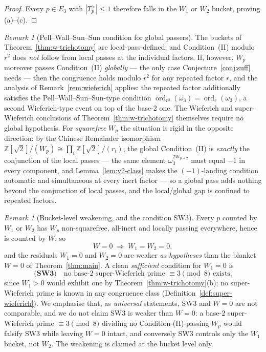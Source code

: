 \documentclass[11pt]{amsart}
\theoremstyle{plain}
\theoremstyle{definition}
\theoremstyle{remark}
\newtheorem{remark}[theorem]{Remark}
\numberwithin{equation}{section}
\newcommand{\ord}{\operatorname{ord}}
\newcommand{\Z}{\mathbb{Z}}
\begin{document}
\begin{proof}
Every $p \in E_3$ with $|T_p^{>}| \leq 1$ therefore falls in the $W_1$ or $W_2$ bucket, proving (a)--(c).
\end{proof}

\begin{remark}[Pell--Wall--Sun--Sun condition for global passers]\label{rem:pell-wss-global}
The buckets of Theorem~\ref{thm:w-trichotomy} are local-pass-defined, and Condition~(II) modulo $r^2$ does \emph{not} follow from local passes at the individual factors. If, however, $W_p$ moreover passes Condition~(II) \emph{globally} --- the only case Conjecture~\ref{conj:suff} needs --- then the congruence holds modulo $r^2$ for any repeated factor $r$, and the analysis of Remark~\ref{rem:wieferich} applies: the repeated factor additionally satisfies the Pell--Wall--Sun--Sun-type condition $\ord_{r^2}(\omega_3) = \ord_r(\omega_3)$, a second Wieferich-type event on top of the base-$2$ one. The Wieferich and super-Wieferich conclusions of Theorem~\ref{thm:w-trichotomy} themselves require no global hypothesis. For \emph{squarefree} $W_p$ the situation is rigid in the opposite direction: by the Chinese Remainder isomorphism $\Z[\sqrt 2]/(W_p) \cong \prod_i \Z[\sqrt 2]/(r_i)$, the global Condition~(II) is \emph{exactly} the conjunction of the local passes --- the same element $\omega_3^{2 W_{p-2}}$ must equal $-1$ in every component, and Lemma~\ref{lem:v2-class} makes the $(-1)$-landing condition automatic and simultaneous at every inert factor --- so a global pass adds nothing beyond the conjunction of local passes, and the local/global gap is confined to repeated factors.
\end{remark}

\begin{remark}[Bucket-level weakening, and the condition SW3]\label{rem:bucket-weakening}
Every $p$ counted by $W_1$ or $W_2$ has $W_p$ non-squarefree, all-inert and locally passing everywhere, hence is counted by $W$; so
\[
  W = 0 \;\Longrightarrow\; W_1 = W_2 = 0,
\]
and the residuals $W_1 = 0$ and $W_2 = 0$ are weaker \emph{as hypotheses} than the blanket $W = 0$ of Theorem~\ref{thm:main}. A clean \emph{sufficient} condition for $W_1 = 0$ is
\[
  \textbf{(SW3)} \quad \text{no base-$2$ super-Wieferich prime $\equiv 3 \pmod 8$ exists,}
\]
since $W_1 > 0$ would exhibit one by Theorem~\ref{thm:w-trichotomy}(b); no super-Wieferich prime is known in any congruence class (Definition~\ref{def:super-wieferich}). We emphasise that, as \emph{universal} statements, SW3 and $W = 0$ are not comparable, and we do not claim SW3 is weaker than $W = 0$: a base-$2$ super-Wieferich prime $\equiv 3 \pmod 8$ dividing no Condition-(II)-passing $W_p$ would falsify SW3 while leaving $W = 0$ intact, and conversely SW3 controls only the $W_1$ bucket, not $W_2$. The weakening is claimed at the bucket level only.
\end{remark}
\end{document}
